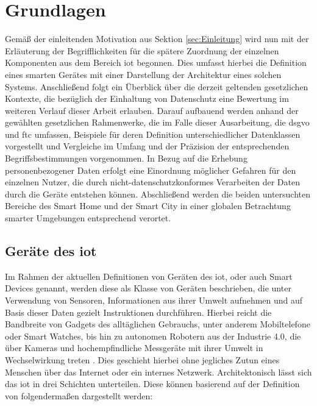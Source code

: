 
\section{Grundlagen}
\label{sec:Grundlagen}

Gemäß der einleitenden Motivation aus Sektion \ref{sec:Einleitung} wird nun mit der Erläuterung der Begrifflichkeiten für die spätere Zuordnung der einzelnen Komponenten aus dem Bereich \ac{iot} begonnen. Dies umfasst hierbei die Definition eines smarten Gerätes mit einer Darstellung der Architektur eines solchen Systems. 
Anschließend folgt ein Überblick über die derzeit geltenden gesetzlichen Kontexte, die bezüglich der Einhaltung von Datenschutz eine Bewertung im weiteren Verlauf dieser Arbeit erlauben. Darauf aufbauend werden anhand der gewählten gesetzlichen Rahmenwerke, die im Falle dieser Ausarbeitung, die \ac{dsgvo} und \ac{ftc} umfassen, Beispiele für deren Definition unterschiedlicher Datenklassen vorgestellt und Vergleiche im Umfang und der Präzision der entsprechenden Begriffsbestimmungen vorgenommen. 
In Bezug auf die Erhebung personenbezogener Daten erfolgt eine Einordnung möglicher Gefahren für den einzelnen Nutzer, die durch nicht-datenschutzkonformes Verarbeiten der Daten durch die Geräte entstehen können. 
Abschließend werden die beiden untersuchten Bereiche des Smart Home und der Smart City in einer globalen Betrachtung smarter Umgebungen entsprechend verortet.\\

\subsection{Geräte des \acl{iot}}
\label{sec:Grundlagen:ssec:Geräte des Internet of Things}

Im Rahmen der aktuellen Definitionen von Geräten des \ac{iot}, oder auch Smart Devices genannt, werden diese als Klasse von Geräten beschrieben, die unter Verwendung von Sensoren, Informationen aus ihrer Umwelt aufnehmen und auf Basis dieser Daten gezielt Instruktionen durchführen. Hierbei reicht die Bandbreite von Gadgets des alltäglichen Gebrauchs, unter anderem Mobiltelefone oder Smart Watches, bis hin zu autonomen Robotern aus der Industrie 4.0, die über Kameras und hochempfindliche Messgeräte mit ihrer Umwelt in Wechselwirkung treten \cite{Li2015}. 
Dies geschieht hierbei ohne jegliches Zutun eines Menschen über das Internet oder ein internes Netzwerk. Architektonisch lässt sich das \ac{iot} in drei Schichten unterteilen. Diese können basierend auf der Definition von \cite{Seliem2018} folgendermaßen dargestellt werden:

